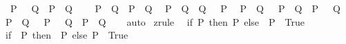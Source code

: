 \begin{isabellebody}
\ \ {\isachardoublequoteopen}{\isasymnot}\ {\isacharparenleft}{\kern0pt}P\ {\isacharequal}{\kern0pt}\ {\isacharparenleft}{\kern0pt}{\isasymnot}\ Q{\isacharparenright}{\kern0pt}{\isacharparenright}{\kern0pt}\ {\isacharequal}{\kern0pt}\ {\isacharparenleft}{\kern0pt}P\ {\isacharequal}{\kern0pt}\ Q{\isacharparenright}{\kern0pt}{\isachardoublequoteclose}\isanewline
\ \ {\isachardoublequoteopen}{\isasymnot}\ {\isacharparenleft}{\kern0pt}{\isacharparenleft}{\kern0pt}{\isasymnot}\ P{\isacharparenright}{\kern0pt}\ {\isacharequal}{\kern0pt}\ Q{\isacharparenright}{\kern0pt}\ {\isacharequal}{\kern0pt}\ {\isacharparenleft}{\kern0pt}P\ {\isacharequal}{\kern0pt}\ Q{\isacharparenright}{\kern0pt}{\isachardoublequoteclose}\isanewline
\ \ {\isachardoublequoteopen}{\isacharparenleft}{\kern0pt}P\ {\isasymnoteq}\ Q{\isacharparenright}{\kern0pt}\ {\isacharequal}{\kern0pt}\ {\isacharparenleft}{\kern0pt}Q\ {\isacharequal}{\kern0pt}\ {\isacharparenleft}{\kern0pt}{\isasymnot}\ P{\isacharparenright}{\kern0pt}{\isacharparenright}{\kern0pt}{\isachardoublequoteclose}\isanewline
\ \ {\isachardoublequoteopen}{\isacharparenleft}{\kern0pt}P\ {\isacharequal}{\kern0pt}\ Q{\isacharparenright}{\kern0pt}\ {\isacharequal}{\kern0pt}\ {\isacharparenleft}{\kern0pt}{\isacharparenleft}{\kern0pt}{\isasymnot}\ P\ {\isasymor}\ Q{\isacharparenright}{\kern0pt}\ {\isasymand}\ {\isacharparenleft}{\kern0pt}P\ {\isasymor}\ {\isasymnot}\ Q{\isacharparenright}{\kern0pt}{\isacharparenright}{\kern0pt}{\isachardoublequoteclose}\isanewline
\ \ {\isachardoublequoteopen}{\isacharparenleft}{\kern0pt}P\ {\isasymnoteq}\ Q{\isacharparenright}{\kern0pt}\ {\isacharequal}{\kern0pt}\ {\isacharparenleft}{\kern0pt}{\isacharparenleft}{\kern0pt}{\isasymnot}\ P\ {\isasymor}\ {\isasymnot}\ Q{\isacharparenright}{\kern0pt}\ {\isasymand}\ {\isacharparenleft}{\kern0pt}P\ {\isasymor}\ Q{\isacharparenright}{\kern0pt}{\isacharparenright}{\kern0pt}{\isachardoublequoteclose}\isanewline
%
\isadelimproof
\ \ %
\endisadelimproof
%
\isatagproof
{}\isamarkupfalse%
\ auto%
\endisatagproof
{\isafoldproof}%
%
\isadelimproof
\isanewline
%
\endisadelimproof
\isanewline
{}\isamarkupfalse%
\ {\isacharbrackleft}{\kern0pt}z{}{\isacharunderscore}{\kern0pt}rule{\isacharbrackright}{\kern0pt}{\isacharcolon}{\kern0pt}\isanewline
\ \ {\isachardoublequoteopen}{\isacharparenleft}{\kern0pt}if\ P\ then\ P\ else\ {\isasymnot}\ P{\isacharparenright}{\kern0pt}\ {\isacharequal}{\kern0pt}\ True{\isachardoublequoteclose}\isanewline
\ \ {\isachardoublequoteopen}{\isacharparenleft}{\kern0pt}if\ {\isasymnot}\ P\ then\ {\isasymnot}\ P\ else\ P{\isacharparenright}{\kern0pt}\ {\isacharequal}{\kern0pt}\ True{\isachardoublequoteclose}\isanewline

\end{isabellebody}
